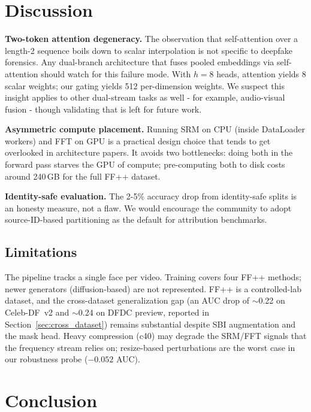 \section{Discussion}

\textbf{Two-token attention degeneracy.}
The observation that self-attention over a length-2 sequence boils down to scalar interpolation is not specific to deepfake forensics. Any dual-branch architecture that fuses pooled embeddings via self-attention should watch for this failure mode. With $h = 8$ heads, attention yields 8 scalar weights; our gating yields 512 per-dimension weights. We suspect this insight applies to other dual-stream tasks as well - for example, audio-visual fusion - though validating that is left for future work.

\textbf{Asymmetric compute placement.}
Running SRM on CPU (inside DataLoader workers) and FFT on GPU is a practical design choice that tends to get overlooked in architecture papers. It avoids two bottlenecks: doing both in the forward pass starves the GPU of compute; pre-computing both to disk costs around 240\,GB for the full FF++ dataset.

\textbf{Identity-safe evaluation.}
The 2-5\% accuracy drop from identity-safe splits is an honesty measure, not a flaw. We would encourage the community to adopt source-ID-based partitioning as the default for attribution benchmarks.

\subsection{Limitations}
The pipeline tracks a single face per video. Training covers four FF++ methods; newer generators (diffusion-based) are not represented. FF++ is a controlled-lab dataset, and the cross-dataset generalization gap (an AUC drop of $\sim$0.22 on Celeb-DF~v2 and $\sim$0.24 on DFDC preview, reported in Section~\ref{sec:cross_dataset}) remains substantial despite SBI augmentation and the mask head. Heavy compression (c40) may degrade the SRM/FFT signals that the frequency stream relies on; resize-based perturbations are the worst case in our robustness probe ($-0.052$ AUC).

\section{Conclusion}


